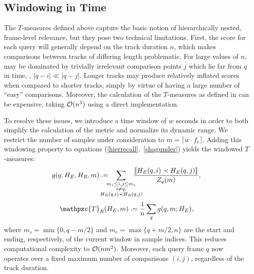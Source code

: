 \documentclass{article}
\def\shag{\ensuremath{\mathpzc{T}}}
\begin{document}

\subsection{Windowing in Time}
\label{sec:window}

The $T$-measures defined above capture the basic notion of hierarchically nested, frame-level relevance, but they pose two technical limitations.
First, the score for each query will generally depend on the track duration $n$, which makes comparisons between tracks of differing length problematic.  
For large values of $n$,  may be dominated by trivially irrelevant comparison points $j$ which lie far from $q$ in time, \ie, $|q-i| \ll |q-j|$.
Longer tracks may produce relatively inflated scores when compared to shorter tracks, simply by virtue of having a large number of ``easy'' comparisons.
Moreover, the calculation of the $T$-measures as defined in  can be expensive, taking $\mathcal{O}(n^3)$ using a direct implementation.

To resolve these issues, we introduce a time window of $w$ seconds in order to both simplify the 
calculation of the metric and normalize its dynamic range.
We restrict the number of samples under consideration to $m = \lceil w \cdot f_r \rceil$.
Adding this windowing property to equations (\ref{hierrecall},~\ref{shagunder}) yields the windowed $T$-measures:
\begin{equation}
    g(q ; H_E, H_R, m) \defeq \hspace{-1.5em} \sum_{\substack{
  m_s \leq i,j \leq m_e \\ 
  i \neq q,\\
  H_R(q, i) \prec H_R(q, j) }}
  \hspace{-1.5em} \frac{\ind{H_E(q, i) \prec H_E(q,
  j)}}{Z_q(m)},\label{windowrecall}
\end{equation}
\begin{equation}
\shag_R(H_E, m) \defeq \frac{1}{n} \sum_q g(q,m ; H_E),
\end{equation}
where $m_s = \min\{0,q-m/2\}$ and $m_e = \max\{q+m/2,n\}$ are the start and ending, respectively, of the current window in sample indices.
This reduces computational complexity to $\mathcal{O}(nm^2)$.  Moreover, each query frame $q$ now operates over a
fixed maximum number of comparisons $(i, j)$, regardless of the track duration.
\end{document}
